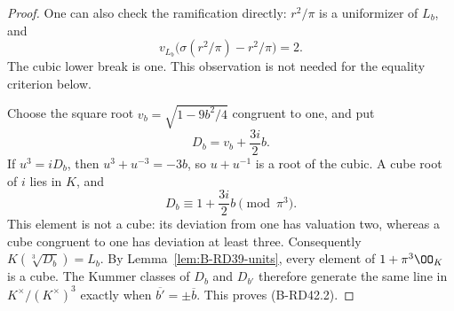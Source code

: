 \begin{proof}
One can also check the ramification directly: $r^2/\pi$ is a
uniformizer of $L_b$, and
\[
 v_{L_b}\bigl(\sigma(r^2/\pi)-r^2/\pi\bigr)=2.
\]
The cubic lower break is one. This observation is not needed for
the equality criterion below.

Choose the square root $v_b=\sqrt{1-9b^2/4}$ congruent to one, and put
\[
                 D_b=v_b+\frac{3i}{2}b.
                                                        \tag{B-RD42.5}
\]
If $u^3=iD_b$, then $u^3+u^{-3}=-3b$, so $u+u^{-1}$ is a root
of the cubic. A cube root of $i$ lies in $K$, and
\[
                    D_b\equiv1+\frac{3i}{2}b\pmod{\pi^3}.
                                                        \tag{B-RD42.6}
\]
This element is not a cube: its deviation from one has valuation
two, whereas a cube congruent to one has deviation at least three.
Consequently $K(\sqrt[3]{D_b})=L_b$. By
Lemma~\ref{lem:B-RD39-units}, every element of $1+\pi^3\OO_K$ is a
cube. The Kummer classes of $D_b$ and $D_{b'}$ therefore generate
the same line in $K^\times/(K^\times)^3$ exactly when
$\overline{b'}=\pm\overline b$. This proves (B-RD42.2).
\end{proof}

